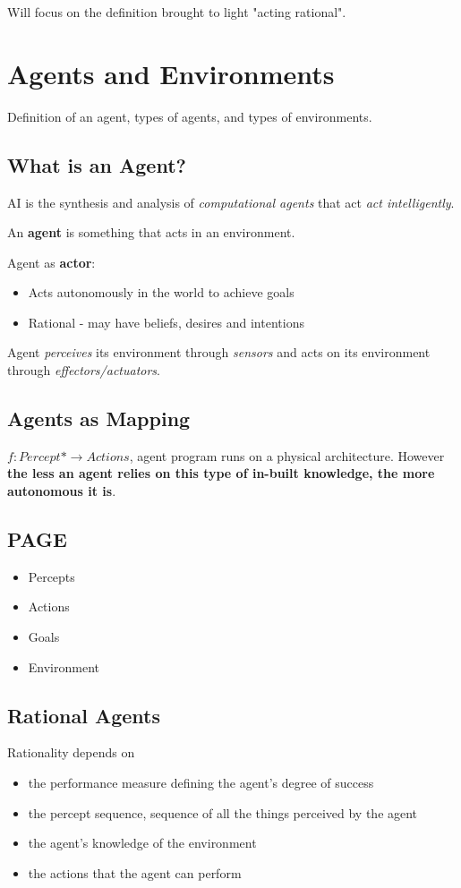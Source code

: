 \documentclass{article}
\begin{document}
Will focus on the definition brought to light "acting rational".

\section{Agents and Environments}
Definition of an agent, types of agents, and types of environments. 

\subsection{What is an Agent?}
AI is the synthesis and analysis of \emph{computational agents} that act \emph{act intelligently}.

An \textbf{agent} is something that acts in an environment.

Agent as \textbf{actor}:
\begin{itemize}
	\item Acts autonomously in the world to achieve goals
	\item Rational - may have beliefs, desires and intentions
\end{itemize}

Agent \emph{perceives} its environment through \emph{sensors} and acts on its environment through \emph{effectors/actuators}.

\subsection{Agents as Mapping}
$f : Percept* \rightarrow Actions$, agent program runs on a physical architecture. However \textbf{the less an agent relies on this type of in-built knowledge, the more autonomous it is}.

\subsection{PAGE}
\begin{itemize}
	\item Percepts
	\item Actions
	\item Goals
	\item Environment
\end{itemize}

\subsection{Rational Agents}
Rationality depends on 
\begin{itemize}
	\item the performance measure defining the agent's degree of success
	\item the percept sequence, sequence of all the things perceived by the agent
	\item the agent's knowledge of the environment
	\item the actions that the agent can perform
\end{itemize}
\end{document}
